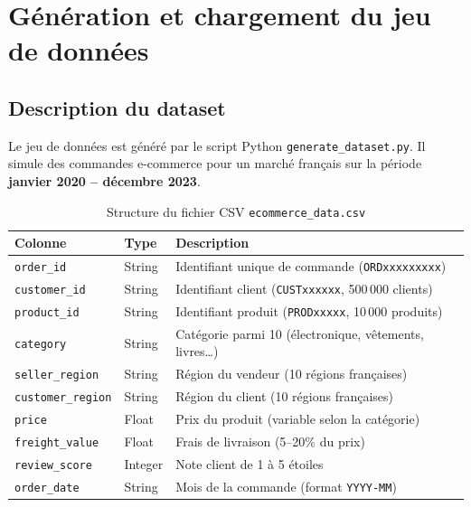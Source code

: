 \documentclass[12pt,a4paper]{article}
\begin{document}
\section{Génération et chargement du jeu de données}
\label{sec:dataset}

\subsection{Description du dataset}

Le jeu de données est généré par le script Python \texttt{generate\_dataset.py}.
Il simule des commandes e-commerce pour un marché français sur la période
\textbf{janvier 2020 -- décembre 2023}.

\begin{table}[H]
  \centering
  \caption{Structure du fichier CSV \texttt{ecommerce\_data.csv}}
  \label{tab:schema}
  \begin{tabularx}{\textwidth}{llX}
    \toprule
    \textbf{Colonne} & \textbf{Type} & \textbf{Description} \\
    \midrule
    \texttt{order\_id}         & String  & Identifiant unique de commande (\texttt{ORDxxxxxxxxx}) \\
    \texttt{customer\_id}      & String  & Identifiant client (\texttt{CUSTxxxxxx}, 500\,000 clients) \\
    \texttt{product\_id}       & String  & Identifiant produit (\texttt{PRODxxxxx}, 10\,000 produits) \\
    \texttt{category}          & String  & Catégorie parmi 10 (électronique, vêtements, livres\ldots) \\
    \texttt{seller\_region}    & String  & Région du vendeur (10 régions françaises) \\
    \texttt{customer\_region}  & String  & Région du client (10 régions françaises) \\
    \texttt{price}             & Float   & Prix du produit (variable selon la catégorie) \\
    \texttt{freight\_value}    & Float   & Frais de livraison (5--20\% du prix) \\
    \texttt{review\_score}     & Integer & Note client de 1 à 5 étoiles \\
    \texttt{order\_date}       & String  & Mois de la commande (format \texttt{YYYY-MM}) \\
    \bottomrule
  \end{tabularx}
\end{table}
\end{document}
